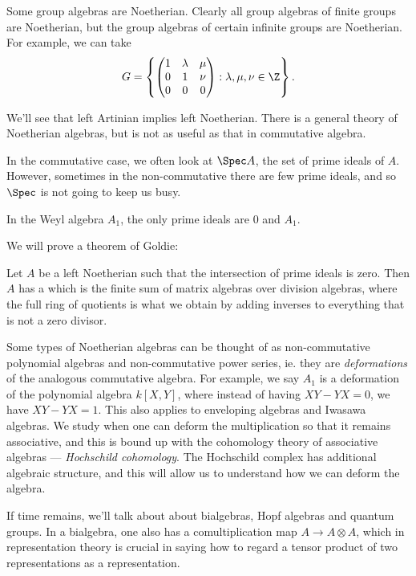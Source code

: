 \documentclass[a4paper]{article}
\begin{document}
\begin{eg}
  Some group algebras are Noetherian. Clearly all group algebras of finite groups are Noetherian, but the group algebras of certain infinite groups are Noetherian. For example, we can take
  \[
    G = \left\{
      \begin{pmatrix}
        1 & \lambda & \mu\\
        0 & 1 & \nu\\
        0 & 0 & 0
      \end{pmatrix}: \lambda, \mu, \nu \in \Z
    \right\}.
  \]
\end{eg}

We'll see that left Artinian implies left Noetherian. There is a general theory of Noetherian algebras, but is not as useful as that in commutative algebra.

In the commutative case, we often look at $\Spec A$, the set of prime ideals of $A$. However, sometimes in the non-commutative there are few prime ideals, and so $\Spec$ is not going to keep us busy.
\begin{eg}
  In the Weyl algebra $A_1$, the only prime ideals are $0$ and $A_1$.
\end{eg}

We will prove a theorem of Goldie:
\begin{thm}
  Let $A$ be a left Noetherian such that the intersection of prime ideals is zero. Then $A$ has a  which is the finite sum of matrix algebras over division algebras, where the full ring of quotients is what we obtain by adding inverses to everything that is not a zero divisor.
\end{thm}

Some types of Noetherian algebras can be thought of as non-commutative polynomial algebras and non-commutative power series, ie. they are \emph{deformations} of the analogous commutative algebra. For example, we say $A_1$ is a deformation of the polynomial algebra $k[X, Y]$, where instead of having $XY - YX = 0$, we have $XY - YX = 1$. This also applies to enveloping algebras and Iwasawa algebras. We study when one can deform the multiplication so that it remains associative, and this is bound up with the cohomology theory of associative algebras --- \emph{Hochschild cohomology}. The Hochschild complex has additional algebraic structure, and this will allow us to understand how we can deform the algebra.

If time remains, we'll talk about about bialgebras, Hopf algebras and quantum groups. In a bialgebra, one also has a comultiplication map $A \to A \otimes A$, which in representation theory is crucial in saying how to regard a tensor product of two representations as a representation.
\end{document}
